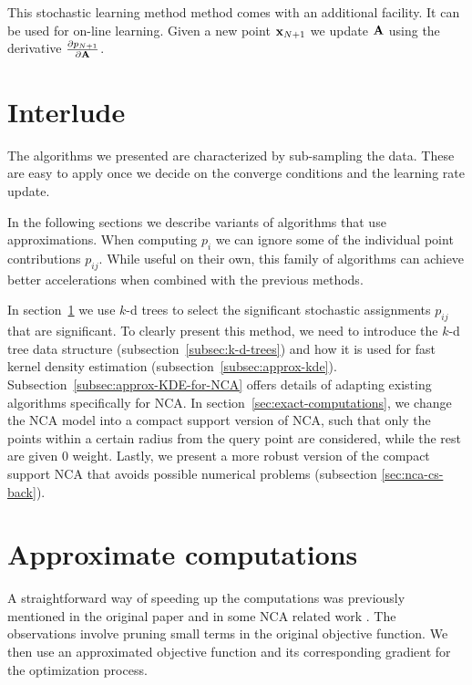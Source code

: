 This stochastic learning method method comes with an additional facility. It can be used for on-line learning. Given a
new point $\mathbf{x}_{N+1}$ we update $\mathbf{A}$ using the derivative $\frac{\partial
p_{N+1}}{\partial \mathbf{A}}$.

\section*{Interlude}

The algorithms we presented are characterized by sub-sampling the data. These are easy to apply once we decide on the converge conditions and the learning rate update.

In the following sections we describe variants of algorithms that use approximations. When computing $p_i$ we can ignore some of the individual point contributions $p_{ij}$. While useful on their own, this family of algorithms can achieve better accelerations when combined with the previous methods. 

In section~\ref{sec:approximate} we use $k$-d trees to select the significant stochastic assignments $p_{ij}$ that are significant. To clearly present this method, we need to introduce the $k$-d tree data structure (subsection~\ref{subsec:k-d-trees}) and how it is used for fast kernel density estimation (subsection~\ref{subsec:approx-kde}). Subsection~\ref{subsec:approx-KDE-for-NCA} offers details of adapting existing algorithms specifically for NCA. In section~\ref{sec:exact-computations}, we change the NCA model into a compact support version of NCA, such that only the points within a certain radius from the query point are considered, while the rest are given $0$ weight. Lastly, we present a more robust version of the compact support NCA that avoids possible numerical problems (subsection \ref{sec:nca-cs-back}).

\section{Approximate computations}
\label{sec:approximate}

A straightforward way of speeding up the computations was previously mentioned
in the original paper \citep{goldberger2004} and in some NCA related work
\citep{weinberger2007, singh2010}. The observations involve pruning small terms in
the original objective function. We then use an approximated objective function
and its corresponding gradient for the optimization process.

